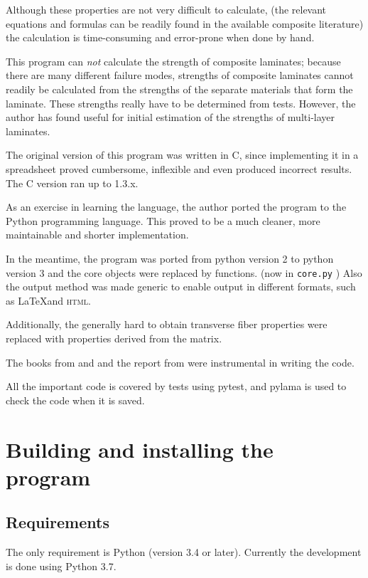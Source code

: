 \documentclass[a4paper,landscape,oneside,11pt,twocolumn]{memoir}
\begin{document}
Although these properties are not very difficult to calculate, (the relevant
equations and formulas can be readily found in the available composite
literature) the calculation is time-consuming and error-prone when done by
hand.

This program can \emph{not} calculate the strength of composite laminates;
because there are many different failure modes, strengths of composite
laminates cannot readily be calculated from the strengths of the separate
materials that form the laminate. These strengths really have to be determined from
tests. However, the author has found \citet{1992WeiEn..52...29H} useful for
initial estimation of the strengths of multi-layer laminates.

The original version of this program was written in C, since implementing
it in a spreadsheet proved cumbersome, inflexible and even produced
incorrect results. The C version ran up to 1.3.x.

As an exercise in learning the language, the author ported the program to
the Python programming language. This proved to be a much cleaner, more
maintainable and shorter implementation.

In the meantime, the program was ported from python version 2 to python
version 3 and the core objects were replaced by functions. (now in
\texttt{core.py} ) Also the output method was made generic to enable output in
different formats, such as \LaTeX and \textsc{html}.

Additionally, the generally hard to obtain transverse fiber properties
were replaced with properties derived from the matrix.

The books from \citet{Hyer:1998} and \citet{Tsai:1992} and the report from
\citet{Nettles:1994} were instrumental in writing the code.

All the important code is covered by tests using pytest, and pylama is used to
check the code when it is saved.

\chapter{Building and installing the program} %

\section{Requirements} %

The only requirement is Python (version 3.4 or later). Currently the
development is done using Python 3.7.
\end{document}

